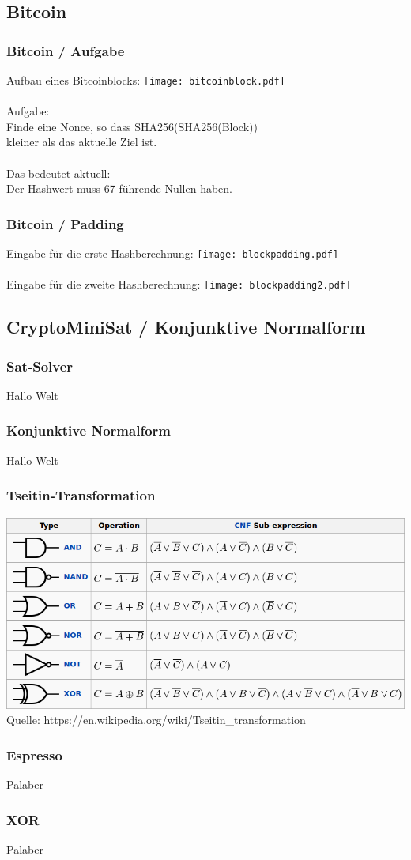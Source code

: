 \documentclass{beamer}
\begin{document}
  \subsection{Bitcoin}
    \begin{frame}
      \frametitle{Bitcoin / Aufgabe}
      Aufbau eines Bitcoinblocks:
      \texttt{[image: bitcoinblock.pdf]}\\
      ~\\
      Aufgabe:\\
      Finde eine Nonce, so dass SHA256(SHA256(Block))\\
      kleiner als das aktuelle Ziel ist.\\
      ~\\
      Das bedeutet aktuell:\\
      Der Hashwert muss 67 führende Nullen haben.
    \end{frame}
    \begin{frame}
      \frametitle{Bitcoin / Padding}
      Eingabe für die erste Hashberechnung:
      \texttt{[image: blockpadding.pdf]}\\
      ~\\
      Eingabe für die zweite Hashberechnung:
      \texttt{[image: blockpadding2.pdf]}\\
  \end{frame}
  \subsection{CryptoMiniSat / Konjunktive Normalform}
    \begin{frame}
      \frametitle{Sat-Solver}
      Hallo Welt
    \end{frame}
    \begin{frame}
      \frametitle{Konjunktive Normalform}
      Hallo Welt
    \end{frame}
    \begin{frame}
      \frametitle{Tseitin-Transformation}
      \includegraphics[scale=1]{tseitin.png}\\
      Quelle: https://en.wikipedia.org/wiki/Tseitin\_transformation
    \end{frame}
    \begin{frame}
      \frametitle{Espresso}
      Palaber
    \end{frame}
    \begin{frame}
      \frametitle{XOR}
      Palaber
    \end{frame}
\end{document}
